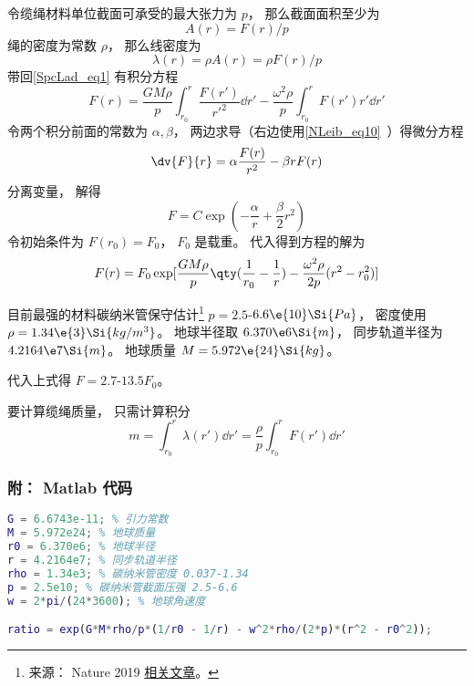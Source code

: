 令缆绳材料单位截面可承受的最大张力为 $p$， 那么截面面积至少为
\begin{equation}
A(r) = F(r)/p
\end{equation}
绳的密度为常数 $\rho$， 那么线密度为
\begin{equation}
\lambda(r) = \rho A(r) = \rho F(r)/p
\end{equation}
带回\autoref{SpcLad_eq1} 有积分方程
\begin{equation}
F(r) = \frac{GM\rho}{p} \int_{r_0}^{r} \frac{F(r')}{r'^2} \dd{r'} - \frac{\omega^2\rho}{p}\int_{r_0}^r F(r') r' \dd{r'}
\end{equation}
令两个积分前面的常数为 $\alpha, \beta$， 两边求导（右边使用\autoref{NLeib_eq10}~）得微分方程
\begin{equation}
\dv{F}{r} = \alpha \frac{F(r)}{r^2} - \beta r F(r)
\end{equation}
分离变量， 解得
\begin{equation}
F = C\exp(-\frac{\alpha}{r} + \frac{\beta}{2} r^2)
\end{equation}
令初始条件为 $F(r_0) = F_0$， $F_0$ 是载重。 代入得到方程的解为
\begin{equation}
F(r) = F_0 \exp[\frac{GM\rho}{p} \qty(\frac{1}{r_0} - \frac{1}{r}) - \frac{\omega^2\rho}{2p}(r^2 - r_0^2)]
\end{equation}

目前最强的材料碳纳米管保守估计\footnote{来源： Nature 2019 \href{https://www.nature.com/articles/s41467-019-10959-7}{相关文章}。} $p = 2.5$-$6.6\e{10} \Si{Pa}$， 密度使用 $\rho = 1.34\e{3} \Si{kg/m^3}$。 地球半径取 $6.370\e6\Si{m}$， 同步轨道半径为 $4.2164\e7 \Si{m}$。 地球质量 $M = 5.972\e{24} \Si{kg}$。

代入上式得 $F = 2.7$-$13.5 F_0$。

要计算缆绳质量， 只需计算积分
\begin{equation}
m = \int_{r_0}^{r} \lambda(r') \dd{r'} = \frac{\rho}{p} \int_{r_0}^{r} F(r') \dd{r'}
\end{equation}

\subsubsection{附： Matlab 代码}
\begin{lstlisting}[language=matlab]
G = 6.6743e-11; % 引力常数
M = 5.972e24; % 地球质量
r0 = 6.370e6; % 地球半径
r = 4.2164e7; % 同步轨道半径
rho = 1.34e3; % 碳纳米管密度 0.037-1.34
p = 2.5e10; % 碳纳米管截面压强 2.5-6.6
w = 2*pi/(24*3600); % 地球角速度

ratio = exp(G*M*rho/p*(1/r0 - 1/r) - w^2*rho/(2*p)*(r^2 - r0^2));
\end{lstlisting}
